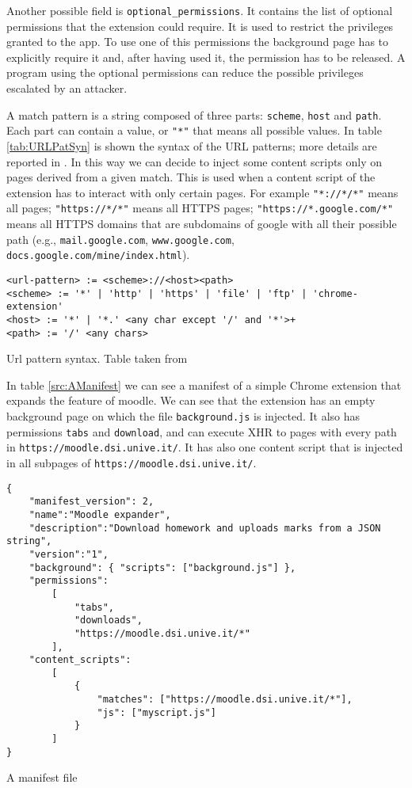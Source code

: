 Another possible field is \texttt{optional\_permissions}. It contains the list of optional permissions that the extension could require. It is used to restrict the privileges granted to the app. To use one of this permissions the background page has to explicitly require it and, after having used it, the permission has to be released. A program using the optional permissions can reduce the possible privileges escalated by an attacker.

A match pattern is a string composed of three parts: \texttt{scheme}, \texttt{host} and \texttt{path}. Each part can contain a value, or \texttt{"*"} that means all possible values. In table \ref{tab:URLPatSyn} is shown the syntax of the URL patterns; more details are reported in \cite{ChromeExtensionMatch}. In this way we can decide to inject some content scripts only on pages derived from a given match. This is used when a content script of the extension has to interact with only certain pages. For example \texttt{"*://*/*"} means all pages; \texttt{"https://*/*"} means all HTTPS pages; \texttt{"https://*.google.com/*"} means all HTTPS domains that are subdomains of google with all their possible path (e.g., \texttt{mail.google.com}, \texttt{www.google.com}, \texttt{docs.google.com/mine/index.html}).

\begin{table}[tlb]
\begin{verbatim}
<url-pattern> := <scheme>://<host><path>
<scheme> := '*' | 'http' | 'https' | 'file' | 'ftp' | 'chrome-extension'
<host> := '*' | '*.' <any char except '/' and '*'>+
<path> := '/' <any chars>
\end{verbatim}
\caption{Url pattern syntax. Table taken from \cite{ChromeExtensionMatch}}
\label{tab:URLPatSyn}
\end{table}

In table \ref{src:AManifest} we can see a manifest of a simple Chrome extension that expands the feature of moodle. We can see that the extension has an empty background page on which the file \texttt{background.js} is injected. It also has permissions \texttt{tabs} and \texttt{download}, and can execute XHR to pages with every path in \texttt{https://moodle.dsi.unive.it/}. It has also one content script that is injected in all subpages of \texttt{https://moodle.dsi.unive.it/}.
\begin{table}[tlb]
\lstset{language=java,showstringspaces=false}
\begin{small}
\begin{lstlisting}
{
	"manifest_version": 2,
	"name":"Moodle expander",
	"description":"Download homework and uploads marks from a JSON string",
	"version":"1",
	"background": { "scripts": ["background.js"] },
	"permissions":  
		[
			"tabs",
			"downloads",
			"https://moodle.dsi.unive.it/*"
		],
	"content_scripts": 
		[
			{
				"matches": ["https://moodle.dsi.unive.it/*"],
				"js": ["myscript.js"]
			}
		]
}
\end{lstlisting}
\end{small}
\caption{A manifest file}
\label{src:AManifest}
\end{table}

